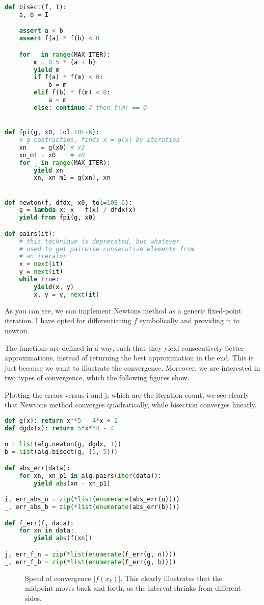 \documentclass[12pt]{article}
\begin{document}
\begin{multicols}{2}
\begin{lstlisting}[language=Python, caption={Bisection and Newtons method}]
def bisect(f, I):
    a, b = I

    assert a < b
    assert f(a) * f(b) < 0

    for _ in range(MAX_ITER):
        m = 0.5 * (a + b)
        yield m
        if f(a) * f(m) < 0:
            b = m
        elif f(b) * f(m) < 0:
            a = m
        else: continue # then f(m) == 0


def fpi(g, x0, tol=10E-6):
    # g contraction, finds x = g(x) by iteration
    xn    = g(x0) # x1
    xn_m1 = x0    # x0
    for _ in range(MAX_ITER):
        yield xn
        xn, xn_m1 = g(xn), xn


def newton(f, dfdx, x0, tol=10E-6):
    g = lambda x: x - f(x) / dfdx(x)
    yield from fpi(g, x0)

def pairs(it):
    # this technique is deprecated, but whatever
    # used to get pairwise consecutive elements from
    # an iterator
    x = next(it)
    y = next(it)
    while True:
        yield(x, y)
        x, y = y, next(it)
\end{lstlisting}
As you can see, we can implement Newtons method
as a generic fixed-point iteration.
I have opted for differentiating $f$ symbolically
and providing it to {\ttfamily newton}.

The functions are defined in a way, such that they
yield consecutively better approximations, instead
of returning the best approximation in the end.
This is just because we want to illustrate the convergence.
Moreover, we are interested in two types of convergence,
which the following figures show.

Plotting the errors versus {\ttfamily i} and {\ttfamily j},
which are the iteration count,
we see clearly that Newtons method converges quadratically,
while bisection converges linearly.

\begin{lstlisting}[language=Python, caption={Comparing the two methods}]
def g(x): return x**5 - 4*x + 2
def dgdx(x): return 5*x**4 - 4

n = list(alg.newton(g, dgdx, 1))
b = list(alg.bisect(g, (1, 5)))

def abs_err(data):
    for xn, xn_p1 in alg.pairs(iter(data)):
        yield abs(xn - xn_p1)

i, err_abs_n = zip(*list(enumerate(abs_err(n))))
_, err_abs_b = zip(*list(enumerate(abs_err(b))))

def f_err(f, data):
    for xn in data:
        yield abs(f(xn))

j, err_f_n = zip(*list(enumerate(f_err(g, n))))
_, err_f_b = zip(*list(enumerate(f_err(g, b))))
\end{lstlisting}
\begin{figure}[H]
\centering

\caption{
    Speed of convergence $|f(x_k)|$.
    This clearly illustrates that the midpoint moves back and forth,
    as the interval shrinks from different sides.
}
\end{figure}
\noindent


\end{multicols}
\end{document}
